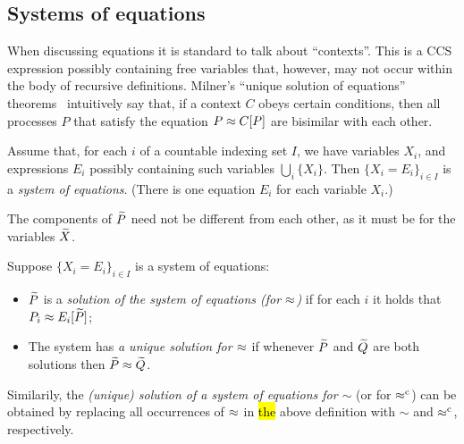\subsection{Systems of equations}
\label{ss:SysEq}
When discussing equations it is standard to talk about ``contexts''. This is
a CCS expression possibly containing free variables that, however, may not occur within
the body of recursive definitions. 
Milner's ``unique solution of equations'' theorems~\cite{Mil89} intuitively
say that, if a context $C$
obeys certain conditions,
then all processes $P$ that satisfy the equation $P \approx C [P]$ are
bisimilar with each other.

\begin{definition}[equations] %
  \label{def:equation}
Assume that, for each $i$ of 
 a countable indexing set $I$, we have variables $X_i$, and expressions
$E_i$ possibly containing such variables $\bigcup_i \{ X_i\}$. Then 
$\{ X_i = E_i\}_{i\in I}$ is 
  a \emph{system of equations}. (There is one equation $E_i$ for each variable $X_i$.)
\end{definition}

The components of $\widetilde P$ need not be
different from each other, as it must be for the variables $\widetilde X$.

\begin{definition}
  \label{def:solution}
Suppose $\{ X_i = E_i\}_{i\in I}$ is a system of equations: 
\begin{itemize}
\item
 $\widetilde P$ is a \emph{solution of the system of equations (for $\approx$)} 
if for each $i$ it holds that $P_i \approx E_i [\widetilde P]$;
\item The system has \emph{a unique solution for $\approx$}  if whenever 
 $\widetilde P$ and $\widetilde Q$ are both solutions then $\widetilde P \approx \widetilde Q$. 
\end{itemize} 
 \end{definition}
Similarily, the \emph{(unique) solution of a system of equations for $\sim$}
(or for $\mathrel{\approx^{\rm{c}}}$) can be obtained by replacing all occurrences of $\approx$
in \hl{the} above definition with $\sim$ and $\mathrel{\approx^{\rm{c}}}$, respectively.

